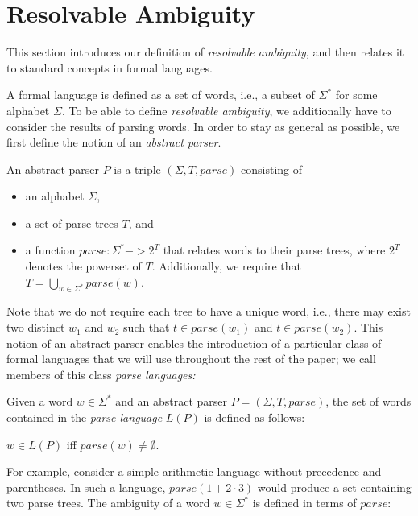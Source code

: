 \documentclass[runningheads]{llncs}
\newcommand{\T}{\Sigma} %
\newcommand{\parse}{\mathit{parse}} %
\newcommand{\regex}{\mathit{Reg}}
\begin{document}

\section{Resolvable Ambiguity} \label{sec:resolvable-definition}

This section introduces our definition of \emph{resolvable ambiguity}, and then relates it to standard concepts in formal languages.

A formal language is defined as a set of words, i.e., a subset of $\T^{*}$ for some alphabet $\T$. To be able to define \emph{resolvable ambiguity}, we additionally have to consider the results of parsing words. In order to stay as general as possible, we first define the notion of an \emph{abstract parser}.

\begin{definition}
  An abstract parser $P$ is a triple $(\T, T, \parse)$ consisting of
\begin{itemize}
\item an alphabet $\T$,
\item a set of parse trees $T$, and
\item a function $\parse : \T^{*} -> 2^T$ that relates words to their parse trees, where $2^T$ denotes the powerset of $T$. Additionally, we require that $T = \bigcup_{w \in \T^{*}} \parse(w)$.
\end{itemize}
\end{definition}

\noindent Note that we do not require each tree to have a unique word, i.e., there may exist two distinct $w_1$ and $w_2$ such that $t \in \parse(w_1)$ and $t \in \parse(w_2)$. This notion of an abstract parser enables the introduction of a particular class of formal languages that we will use throughout the rest of the paper; we call members of this class \emph{parse languages:}

\begin{definition}
  Given a word $w \in \T^{*}$ and an abstract parser $P = (\T, T,
  \parse)$, the set of words contained in the \emph{parse language}
  $L(P)$ is defined as follows:

  $w \in L(P)$ iff $\parse(w) \neq \emptyset$.
\end{definition}

\noindent For example, consider a simple arithmetic language without precedence and parentheses. In such a language, $\parse(1 + 2 \cdot 3)$ would produce a set containing two parse trees. %
%
%
The ambiguity of a word $w \in \T^{*}$ is defined in terms of $\parse$:
\end{document}
